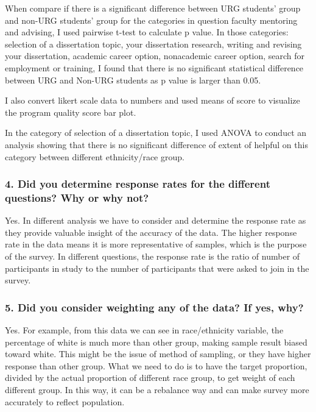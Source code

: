 \documentclass[
]{article}
\begin{document}
When compare if there is a significant difference between URG students'
group and non-URG students' group for the categories in question faculty
mentoring and advising, I used pairwise t-test to calculate p value. In
those categories: selection of a dissertation topic, your dissertation
research, writing and revising your dissertation, academic career
option, nonacademic career option, search for employment or training, I
found that there is no significant statistical difference between URG
and Non-URG students as p value is larger than 0.05.

I also convert likert scale data to numbers and used means of score to
visualize the program quality score bar plot.

In the category of selection of a dissertation topic, I used ANOVA to
conduct an analysis showing that there is no significant difference of
extent of helpful on this category between different ethnicity/race
group.

\hypertarget{did-you-determine-response-rates-for-the-different-questions-why-or-why-not}{%
\subsubsection{4. Did you determine response rates for the different
questions? Why or why
not?}\label{did-you-determine-response-rates-for-the-different-questions-why-or-why-not}}

Yes. In different analysis we have to consider and determine the
response rate as they provide valuable insight of the accuracy of the
data. The higher response rate in the data means it is more
representative of samples, which is the purpose of the survey. In
different questions, the response rate is the ratio of number of
participants in study to the number of participants that were asked to
join in the survey.

\hypertarget{did-you-consider-weighting-any-of-the-data-if-yes-why}{%
\subsubsection{5. Did you consider weighting any of the data? If yes,
why?}\label{did-you-consider-weighting-any-of-the-data-if-yes-why}}

Yes. For example, from this data we can see in race/ethnicity variable,
the percentage of white is much more than other group, making sample
result biased toward white. This might be the issue of method of
sampling, or they have higher response than other group. What we need to
do is to have the target proportion, divided by the actual proportion of
different race group, to get weight of each different group. In this
way, it can be a rebalance way and can make survey more accurately to
reflect population.
\end{document}
